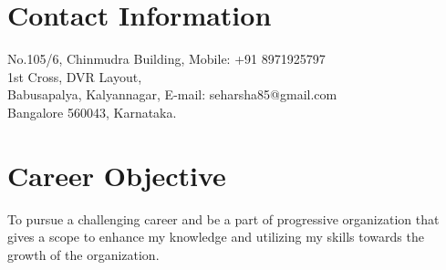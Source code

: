 \documentclass[line]{resume}
\begin{document}
\normalsize{
\begin{resume}
    \setcounter{page}{1}
    \section{\mysidestyle Contact Information} \vspace{1mm}
    No.105/6, Chinmudra Building,           					    \hfill Mobile: +91 8971925797\\
    1st Cross, DVR Layout,\\
    Babusapalya, Kalyannagar,                                 \hfill E-mail: seharsha85@gmail.com\\
    Bangalore 560043, Karnataka.\\                      %
              
    
    
    
                                      


   \section{\mysidestyle Career Objective} \vspace{1mm}
       To pursue a challenging career and be a part of progressive organization that gives a scope to enhance my knowledge 
       and utilizing my skills towards the growth of the organization.

\end{resume}}
\end{document}
